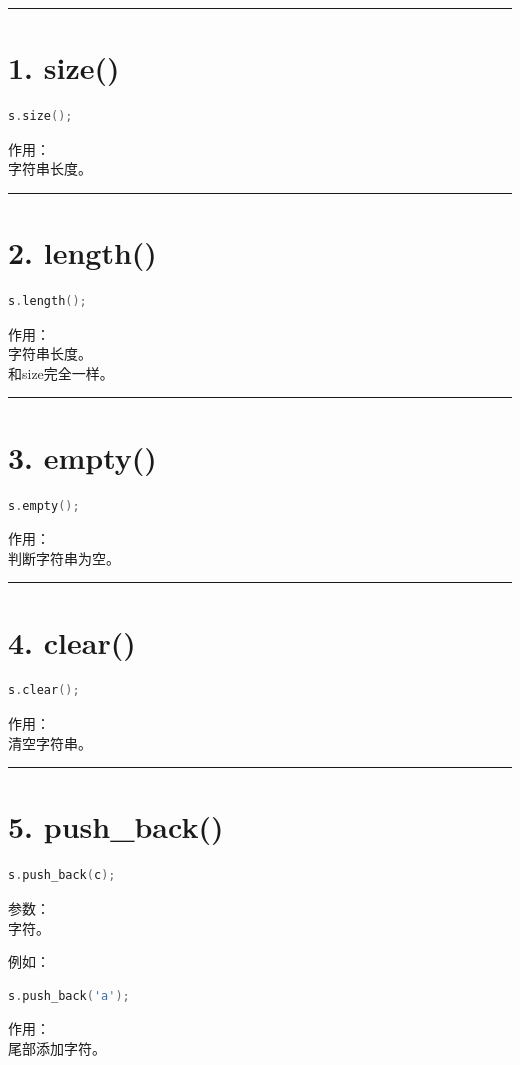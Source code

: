 \documentclass[10pt,twocolumn]{extarticle}
\begin{document}
\noindent\rule{\linewidth}{0.4pt}

\section{1. size()}
\begin{lstlisting}[language=C++]
s.size();
\end{lstlisting}
作用：\\
字符串长度。

\noindent\rule{\linewidth}{0.4pt}

\section{2. length()}
\begin{lstlisting}[language=C++]
s.length();
\end{lstlisting}
作用：\\
字符串长度。\\
和size完全一样。

\noindent\rule{\linewidth}{0.4pt}

\section{3. empty()}
\begin{lstlisting}[language=C++]
s.empty();
\end{lstlisting}
作用：\\
判断字符串为空。

\noindent\rule{\linewidth}{0.4pt}

\section{4. clear()}
\begin{lstlisting}[language=C++]
s.clear();
\end{lstlisting}
作用：\\
清空字符串。

\noindent\rule{\linewidth}{0.4pt}

\section{5. push\_back()}
\begin{lstlisting}[language=C++]
s.push_back(c);
\end{lstlisting}
参数：\\
字符。

例如：
\begin{lstlisting}[language=C++]
s.push_back('a');
\end{lstlisting}
作用：\\
尾部添加字符。
\end{document}
